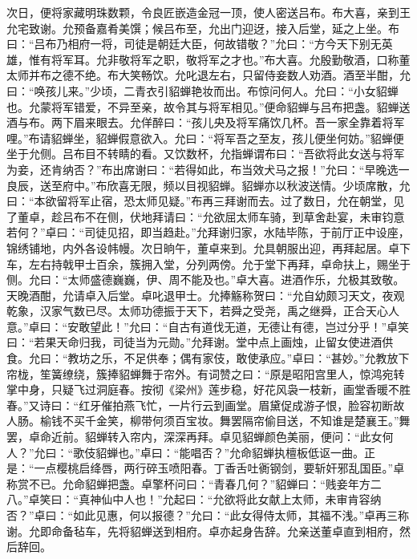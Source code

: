 次日，便将家藏明珠数颗，令良匠嵌造金冠一顶，使人密送吕布。布大喜，亲到王允宅致谢。允预备嘉肴美馔；候吕布至，允出门迎迓，接入后堂，延之上坐。布曰：“吕布乃相府一将，司徒是朝廷大臣，何故错敬？”允曰：“方今天下别无英雄，惟有将军耳。允非敬将军之职，敬将军之才也。”布大喜。允殷勤敬酒，口称董太师并布之德不绝。布大笑畅饮。允叱退左右，只留侍妾数人劝酒。酒至半酣，允曰：“唤孩儿来。”少顷，二青衣引貂蝉艳妆而出。布惊问何人。允曰：“小女貂蝉也。允蒙将军错爱，不异至亲，故令其与将军相见。”便命貂蝉与吕布把盏。貂蝉送酒与布。两下眉来眼去。允佯醉曰：“孩儿央及将军痛饮几杯。吾一家全靠着将军哩。”布请貂蝉坐，貂蝉假意欲入。允曰：“将军吾之至友，孩儿便坐何妨。”貂蝉便坐于允侧。吕布目不转睛的看。又饮数杯，允指蝉谓布曰：“吾欲将此女送与将军为妾，还肯纳否？”布出席谢曰：“若得如此，布当效犬马之报！”允曰：“早晚选一良辰，送至府中。”布欣喜无限，频以目视貂蝉。貂蝉亦以秋波送情。少顷席散，允曰：“本欲留将军止宿，恐太师见疑。”布再三拜谢而去。过了数日，允在朝堂，见了董卓，趁吕布不在侧，伏地拜请曰：“允欲屈太师车骑，到草舍赴宴，未审钧意若何？”卓曰：“司徒见招，即当趋赴。”允拜谢归家，水陆毕陈，于前厅正中设座，锦绣铺地，内外各设帏幔。次日晌午，董卓来到。允具朝服出迎，再拜起居。卓下车，左右持戟甲士百余，簇拥入堂，分列两傍。允于堂下再拜，卓命扶上，赐坐于侧。允曰：“太师盛德巍巍，伊、周不能及也。”卓大喜。进酒作乐，允极其致敬。天晚酒酣，允请卓入后堂。卓叱退甲士。允捧觞称贺曰：“允自幼颇习天文，夜观乾象，汉家气数已尽。太师功德振于天下，若舜之受尧，禹之继舜，正合天心人意。”卓曰：“安敢望此！”允曰：“自古有道伐无道，无德让有德，岂过分乎！”卓笑曰：“若果天命归我，司徒当为元勋。”允拜谢。堂中点上画烛，止留女使进酒供食。允曰：“教坊之乐，不足供奉；偶有家伎，敢使承应。”卓曰：“甚妙。”允教放下帘栊，笙簧缭绕，簇捧貂蝉舞于帘外。有词赞之曰：“原是昭阳宫里人，惊鸿宛转掌中身，只疑飞过洞庭春。按彻《梁州》莲步稳，好花风袅一枝新，画堂香暖不胜春。”又诗曰：“红牙催拍燕飞忙，一片行云到画堂。眉黛促成游子恨，脸容初断故人肠。榆钱不买千金笑，柳带何须百宝妆。舞罢隔帘偷目送，不知谁是楚襄王。”舞罢，卓命近前。貂蝉转入帘内，深深再拜。卓见貂蝉颜色美丽，便问：“此女何人？”允曰：“歌伎貂蝉也。”卓曰：“能唱否？”允命貂蝉执檀板低讴一曲。正是：“一点樱桃启绛唇，两行碎玉喷阳春。丁香舌吐衠钢剑，要斩奸邪乱国臣。”卓称赏不已。允命貂蝉把盏。卓擎杯问曰：“青春几何？”貂蝉曰：“贱妾年方二八。”卓笑曰：“真神仙中人也！”允起曰：“允欲将此女献上太师，未审肯容纳否？”卓曰：“如此见惠，何以报德？”允曰：“此女得侍太师，其福不浅。”卓再三称谢。允即命备毡车，先将貂蝉送到相府。卓亦起身告辞。允亲送董卓直到相府，然后辞回。

